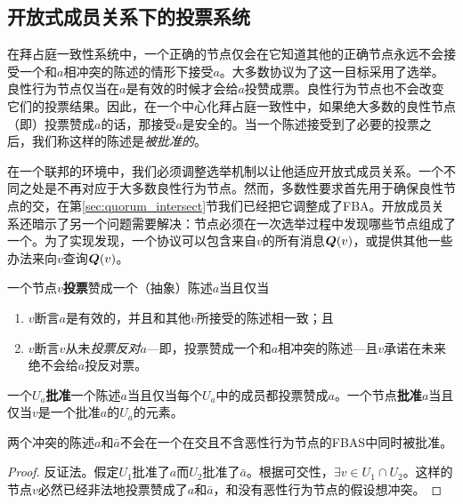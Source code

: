 \subsection{开放式成员关系下的投票系统}

在拜占庭一致性系统中，一个正确的节点仅会在它知道其他的正确节点永远不会接受一个和$a$相冲突的陈述的情形下接受$a$。大多数协议为了这一目标采用了选举。良性行为节点仅当在$a$是有效的时候才会给$a$投赞成票。良性行为节点也不会改变它们的投票结果。因此，在一个中心化拜占庭一致性中，如果绝大多数的良性节点（即{\quorum}）投票赞成$a$的话，那接受$a$是安全的。当一个陈述接受到了必要的投票之后，我们称这样的陈述是\textit{被批准的}。

在一个联邦的环境中，我们必须调整选举机制以让他适应开放式成员关系。一个不同之处是{\quorum}不再对应于大多数良性行为节点。然而，多数性要求首先用于确保良性节点的{\quorum}交，在第\ref{sec:quorum_intersect}节我们已经把它调整成了FBA。开放成员关系还暗示了另一个问题需要解决：节点必须在一次选举过程中发现哪些节点组成了一个{\quorum}。为了实现{\quorum}发现，一个协议可以包含来自$v$的所有消息${\bm Q}(v)$，或提供其他一些办法来向$v$查询${\bm Q}(v)$。

\begin{definition}[投票]
        一个节点$v$\textbf{投票}赞成一个（抽象）陈述$a$当且仅当
        \begin{enumerate}
                \item $v$断言$a$是有效的，并且和其他$v$所接受的陈述相一致；且
                \item $v$断言$v$从未\textit{投票反对}$a$---即，投票赞成一个和$a$相冲突的陈述---且$v$承诺在未来绝不会给$a$投反对票。
        \end{enumerate}
\end{definition}

\begin{definition}[批准]
        一个{\quorum}$U_a$\textbf{批准}一个陈述$a$当且仅当每个$U_a$中的成员都投票赞成$a$。一个节点\textbf{批准}$a$当且仅当$v$是一个批准$a$的{\quorum}$U_a$的元素。
\end{definition}

\begin{theorem}\label{th4}
        两个冲突的陈述$a$和$\bar a$不会在一个在{\quorum}交且不含恶性行为节点的FBAS中同时被批准。
\end{theorem}

\begin{proof}
        反证法。假定{\quorum}$U_1$批准了$a$而{\quorum}$U_2$批准了$\bar a$。根据{\quorum}可交性，$\exists v\in U_1\cap U_2$。这样的节点$v$必然已经非法地投票赞成了$a$和$\bar a$，和没有恶性行为节点的假设想冲突。
\end{proof}

